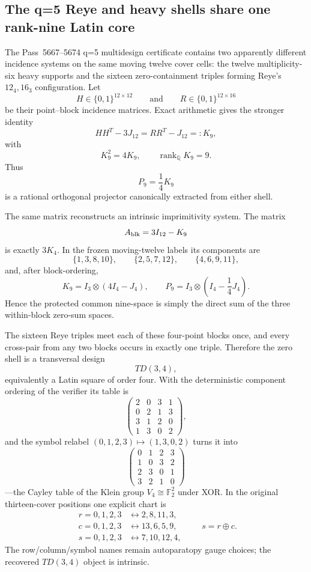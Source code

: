 \subsection{The q=5 Reye and heavy shells share one rank-nine Latin core}
\label{sec:pass5776-5783-reye-latin-common-core}

The Pass~5667--5674 q=5 multidesign certificate contains two apparently
different incidence systems on the same moving twelve cover cells: the twelve
multiplicity-six heavy supports and the sixteen zero-containment triples forming
Reye's $12_4,16_3$ configuration.  Let
\[
 H\in\{0,1\}^{12\times12}
 \qquad\text{and}\qquad
 R\in\{0,1\}^{12\times16}
\]
be their point--block incidence matrices.  Exact arithmetic gives the stronger
identity
\[
 \boxed{
 HH^{T}-3J_{12}=RR^{T}-J_{12}=:K_9,
 }
\]
with
\[
 \boxed{K_9^2=4K_9},
 \qquad
 \boxed{\operatorname{rank}_{\mathbb Q}K_9=9}.
\]
Thus
\[
 \boxed{P_9=\frac14K_9}
\]
is a rational orthogonal projector canonically extracted from either shell.

The same matrix reconstructs an intrinsic imprimitivity system.  The matrix
\[
 A_{\rm blk}=3I_{12}-K_9
\]
is exactly $3K_4$.  In the frozen moving-twelve labels its components are
\[
 \{1,3,8,10\},\qquad
 \{2,5,7,12\},\qquad
 \{4,6,9,11\},
\]
and, after block-ordering,
\[
 K_9=I_3\otimes(4I_4-J_4),
 \qquad
 P_9=I_3\otimes\left(I_4-\frac14J_4\right).
\]
Hence the protected common nine-space is simply the direct sum of the three
within-block zero-sum spaces.

The sixteen Reye triples meet each of these four-point blocks once, and every
cross-pair from any two blocks occurs in exactly one triple.  Therefore the
zero shell is a transversal design
\[
 \boxed{TD(3,4)},
\]
equivalently a Latin square of order four.  With the deterministic component
ordering of the verifier its table is
\[
\begin{pmatrix}
2&0&3&1\\
0&2&1&3\\
3&1&2&0\\
1&3&0&2
\end{pmatrix},
\]
and the symbol relabel $(0,1,2,3)\mapsto(1,3,0,2)$ turns it into
\[
 \boxed{
 \begin{pmatrix}
 0&1&2&3\\
 1&0&3&2\\
 2&3&0&1\\
 3&2&1&0
 \end{pmatrix}
 }
\]
---the Cayley table of the Klein group $V_4\cong\mathbb F_2^2$ under XOR.
In the original thirteen-cover positions one explicit chart is
\[
\begin{aligned}
 r=0,1,2,3&\longleftrightarrow 2,8,11,3,\\
 c=0,1,2,3&\longleftrightarrow 13,6,5,9,\\
 s=0,1,2,3&\longleftrightarrow 7,10,12,4,
\end{aligned}
\qquad
\boxed{s=r\oplus c}.
\]
The row/column/symbol names remain autoparatopy gauge choices; the recovered
$TD(3,4)$ object is intrinsic.

